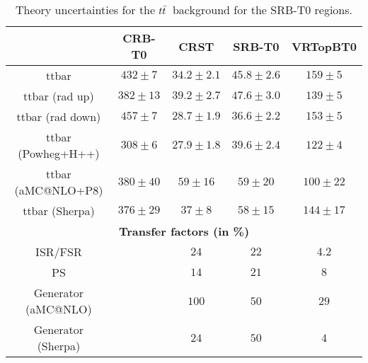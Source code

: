 \begin{description}
 \begin{table}[!h]
    \begin{center} \footnotesize
      \begin{tabular}{|c|c|c|c|c|}
        \hline
        & CRB-T0 & CRST & SRB-T0 & VRTopBT0\\
        \hline
        ttbar&   $432\pm 7 $&    $34.2\pm 2.1 $&         $45.8\pm 2.6 $&         $159\pm 5 $\\
        ttbar (rad up)&          $382\pm 13 $&   $39.2\pm 2.7 $&         $47.6\pm 3.0 $&         $139\pm 5 $\\
        ttbar (rad down)&        $457\pm 7 $&    $28.7\pm 1.9 $&         $36.6\pm 2.2 $&         $153\pm 5 $\\
        ttbar (Powheg+H++)&      $308\pm 6 $&    $27.9\pm 1.8 $&         $39.6\pm 2.4 $&         $122\pm 4 $\\
        ttbar (aMC@NLO+P8)&      $380\pm 40 $&   $59\pm 16 $&    $59\pm 20 $&    $100\pm 22 $\\
        ttbar (Sherpa)&          $376\pm 29 $&   $37\pm 8 $&     $58\pm 15 $&    $144\pm 17 $\\
\hline
        \multicolumn{5}{c}{\bf Transfer factors (in \%)} \\ \hline
        ISR/FSR &    &    $24$&   $22$&   $4.2$\\
        PS &   &    $14$&   $21$&   $8$\\
        Generator (aMC@NLO) &  &      $100$&          $50$&   $29$\\
        Generator (Sherpa) &   &     $24$&   $50$&   $4$\\        
        \hline       
        \end{tabular}
    \end{center}
    \caption{Theory uncertainties for the $t\bar{t}$\ background for the SRB-T0 regions.}
    \label{tab:ttbar_unc_SRB_T0}
  \end{table}



\end{description}
